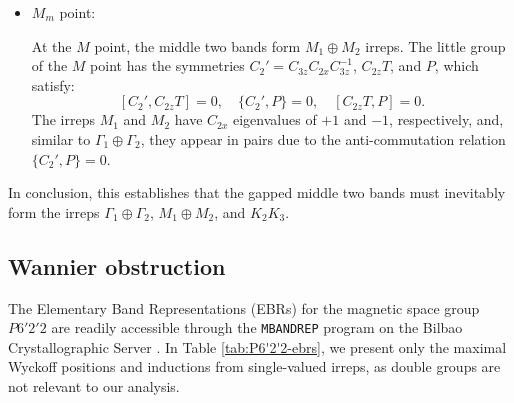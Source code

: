 \begin{itemize}
\item $M_m$ point:

At the \(M\) point, the middle two bands form \(M_1 \oplus M_2\) irreps. The little group of the \(M\) point has the symmetries \(C_2' = C_{3z}C_{2x}C_{3z}^{-1}\), \(C_{2z}T\), and \(P\), which satisfy:
\[
[C_2', C_{2z}T] = 0, \quad \{C_2', P\} = 0, \quad [C_{2z}T, P] = 0.
\]
The irreps \(M_1\) and \(M_2\) have \(C_{2x}\) eigenvalues of \(+1\) and \(-1\), respectively, and, similar to \(\Gamma_1 \oplus \Gamma_2\), they appear in pairs due to the anti-commutation relation \(\{C_2', P\} = 0\).

\end{itemize}

In conclusion, this establishes that the gapped middle two bands must inevitably form the irreps \( \Gamma_1 \oplus \Gamma_2 \), \( M_1 \oplus M_2 \), and \( K_2K_3 \).




\subsection{Wannier obstruction} \label{subsec:wannier_obstruction_mbm_1v}

The Elementary Band Representations (EBRs) for the magnetic space group \( P6'2'2 \) are readily accessible through the \texttt{MBANDREP} program on the Bilbao Crystallographic Server \cite{bilbao_1, bilbao_2}. In Table \ref{tab:P6'2'2-ebrs}, we present only the maximal Wyckoff positions and inductions from single-valued irreps, as double groups are not relevant to our analysis.

